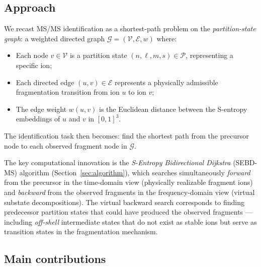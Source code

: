 \documentclass[twocolumn,10pt,a4paper]{article}
\theoremstyle{thmstyle}
\theoremstyle{definition}
\theoremstyle{remark}
\newcommand{\Parts}{\mathcal{P}}
\newcommand{\calG}{\mathcal{G}}
\newcommand{\calV}{\mathcal{V}}
\newcommand{\calE}{\mathcal{E}}
\begin{document}
\subsection{Approach}

We recast MS/MS identification as a shortest-path problem on the
\emph{partition-state graph}: a weighted directed graph $\calG =
(\calV, \calE, w)$ where:
\begin{itemize}[nosep]
\item Each node $v \in \calV$ is a partition state
  $(n, \ell, m, s) \in \Parts$, representing a specific ion;
\item Each directed edge $(u, v) \in \calE$ represents a physically
  admissible fragmentation transition from ion $u$ to ion $v$;
\item The edge weight $w(u, v)$ is the Euclidean distance between the
  S-entropy embeddings of $u$ and $v$ in $[0,1]^3$.
\end{itemize}

The identification task then becomes: find the shortest path from the
precursor node to each observed fragment node in $\calG$.

The key computational innovation is the \emph{S-Entropy Bidirectional
Dijkstra} (SEBD-MS) algorithm (Section~\ref{sec:algorithm}), which searches
simultaneously \emph{forward} from the precursor in the time-domain view
(physically realizable fragment ions) and \emph{backward} from the observed
fragments in the frequency-domain view (virtual substate decompositions).
The virtual backward search corresponds to finding predecessor partition
states that could have produced the observed fragments --- including
\emph{off-shell} intermediate states that do not exist as stable ions but
serve as transition states in the fragmentation mechanism.

\subsection{Main contributions}
\end{document}
